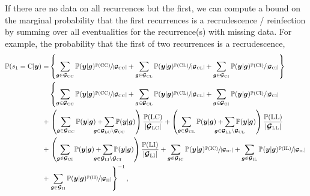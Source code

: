 \documentclass{article}
\begin{document}
If there are no data on all recurrences but the first, we can compute a bound on the marginal probability that the first recurrences is a recrudescence / reinfection by summing over all eventualities for the recurrence(s) with missing data. For example, the probability that the first of two recurrences is a recrudescence,
\begin{align*}
    \mathbb{P}(s_1 = \recru | \bm{y}) = 
    &\left\{
    \sum_{\rg\in\RG_{\recru\recru}} \mathbb{P}(\bm{y} | \rg) 
    \sfrac{\mathbb{P}(\recru\recru)}{|\RG_{\recru\recru}|} + 
    \sum_{\rg\in\RG_{\recru\relap}} \mathbb{P}(\bm{y} | \rg) 
    \sfrac{\mathbb{P}(\recru\relap)}{|\RG_{\recru\relap}|} + 
    \sum_{\rg\in\RG_{\recru\reinf}} \mathbb{P}(\bm{y} | \rg) 
    \sfrac{\mathbb{P}(\recru\reinf)}{|\RG_{\recru\reinf}|}
    \right\} \\
    &\left\{
    \sum_{\rg\in\RG_{\recru\recru}} \mathbb{P}(\bm{y} | \rg) 
    \sfrac{\mathbb{P}(\recru\recru)}{|\RG_{\recru\recru}|} + 
    \sum_{\rg\in\RG_{\recru\relap}} \mathbb{P}(\bm{y} | \rg) 
    \sfrac{\mathbb{P}(\recru\relap)}{|\RG_{\recru\relap}|} + 
    \sum_{\rg\in\RG_{\recru\reinf}} \mathbb{P}(\bm{y} | \rg) 
    \sfrac{\mathbb{P}(\recru\reinf)}{|\RG_{\recru\reinf}|} 
    \right. \\ 
    + &\left. 
    \left(
    \sum_{\rg\in\RG_{\recru\recru}} \mathbb{P}(\bm{y} | \rg) + 
    \smashoperator{\sum_{\rg\in\RG_{\relap\recru}\setminus\RG_{\recru\recru}}} 
    \mathbb{P}(\bm{y} | \rg)
    \right) \frac{\mathbb{P}(\relap\recru)}{|\RG_{\relap\recru}|} 
    + 
    \left(
    \sum_{\rg\in\RG_{\recru\relap}} \mathbb{P}(\bm{y} | \rg) +
    \smashoperator{\sum_{\rg\in\RG_{\relap\relap}\setminus\RG_{\recru\relap}}}
    \mathbb{P}(\bm{y} | \rg) \right) \frac{\mathbb{P}(\relap\relap)}{|\RG_{\relap\relap}|} 
    \right. \\ 
    + &\left.   
    \left(
    \sum_{\rg\in\RG_{\recru\reinf}} \mathbb{P}(\bm{y} | \rg) +
    \smashoperator{\sum_{\rg\in\RG_{\relap\reinf}\setminus\RG_{\recru\reinf}}}
    \mathbb{P}(\bm{y} | \rg) \right) \frac{\mathbb{P}(\relap\reinf)}{|\RG_{\relap\reinf}|} + 
    \sum_{\rg\in\RG_{\reinf\recru}} \mathbb{P}(\bm{y} | \rg) 
    \sfrac{\mathbb{P}(\reinf\recru)}{|\RG_{\reinf\recru}|} + 
    \sum_{\rg\in\RG_{\reinf\relap}} \mathbb{P}(\bm{y} | \rg) 
    \sfrac{\mathbb{P}(\reinf\relap)}{|\RG_{\reinf\relap}|} \right.\\
    + &\left.
    \sum_{\rg\in\RG_{\reinf\reinf}} \mathbb{P}(\bm{y} | \rg) 
    \sfrac{\mathbb{P}(\reinf\reinf)}{|\RG_{\reinf\reinf}|} 
    \right\}^{-1}, 
\end{align*}
\end{document}
